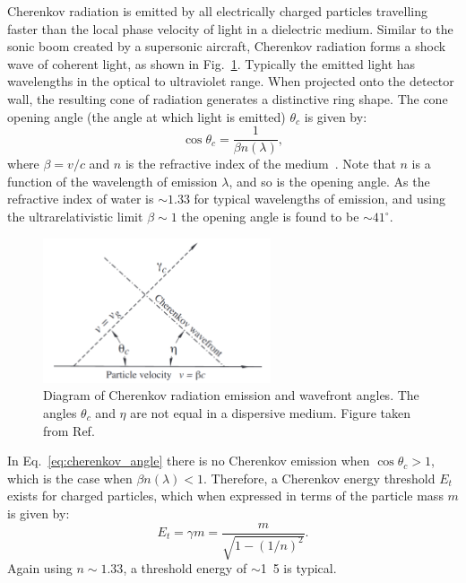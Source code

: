 Cherenkov radiation is emitted by all electrically charged particles travelling faster than the
local phase velocity of light in a dielectric medium. Similar to the sonic boom created by a
supersonic aircraft, Cherenkov radiation forms a shock wave of coherent light, as shown in
Fig.~\ref{fig:cherenkov}. Typically the emitted light has wavelengths in the optical to
ultraviolet range. When projected onto the detector wall, the resulting cone of radiation
generates a distinctive ring shape. The cone opening angle (the angle at which light is emitted)
$\theta_{c}$ is given by:
\begin{equation}
    \cos\theta_{c} = \frac{1}{\beta n(\lambda)},
    \label{eq:cherenkov_angle}
\end{equation}
where $\beta=v/c$ and $n$ is the refractive index of the medium~\cite{particle2020}. Note that $n$
is a function of the wavelength of emission $\lambda$, and so is the opening angle. As the
refractive index of water is $\sim 1.33$ for typical wavelengths of emission, and using the
ultrarelativistic limit $\beta\sim 1$ the opening angle is found to be $\sim41^{\circ}$.

\begin{figure} %
    \includegraphics[width=0.6\textwidth]{diagrams/4-chips/cherenkov.pdf}
    \caption[Diagram of Cherenkov radiation emission]
    {Diagram of Cherenkov radiation emission and wavefront angles. The angles $\theta_{c}$ and
        $\eta$ are not equal in a dispersive medium. Figure taken from Ref.~\cite{particle2020}}
    \label{fig:cherenkov}
\end{figure}

In Eq.~\ref{eq:cherenkov_angle} there is no Cherenkov emission when $\cos\theta_{c} > 1$, which is
the case when $\beta n(\lambda)<1$. Therefore, a Cherenkov energy threshold $E_{t}$ exists for
charged particles, which when expressed in terms of the particle mass $m$ is given by:
\begin{equation}
    E_{t} = \gamma m = \frac{m}{\sqrt{1-(1/n)^{2}}}.
    \label{eq:cherenkov_threshold}
\end{equation}
Again using $n\sim 1.33$, a threshold energy of $\sim$\unit{1.5}{} is typical.

